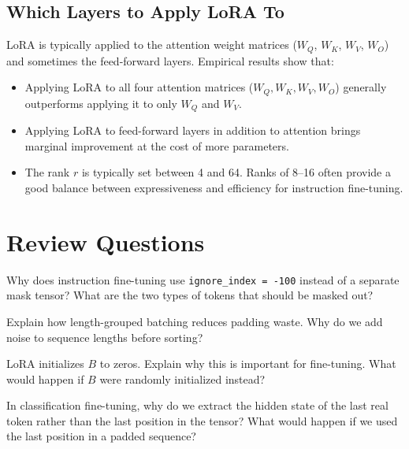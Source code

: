 \subsection{Which Layers to Apply LoRA To}

LoRA is typically applied to the attention weight matrices ($W_Q$,
$W_K$, $W_V$, $W_O$) and sometimes the feed-forward layers. Empirical
results show that:

\begin{itemize}
  \item Applying LoRA to all four attention matrices ($W_Q, W_K, W_V,
        W_O$) generally outperforms applying it to only $W_Q$ and
        $W_V$.
  \item Applying LoRA to feed-forward layers in addition to attention
        brings marginal improvement at the cost of more parameters.
  \item The rank $r$ is typically set between 4 and 64. Ranks of 8--16
        often provide a good balance between expressiveness and
        efficiency for instruction fine-tuning.
\end{itemize}

\section*{Review Questions}

\begin{reviewquestion}[1]
  Why does instruction fine-tuning use \texttt{ignore\_index = -100}
  instead of a separate mask tensor? What are the two types of tokens
  that should be masked out?
\end{reviewquestion}

\begin{reviewquestion}[2]
  Explain how length-grouped batching reduces padding waste. Why do
  we add noise to sequence lengths before sorting?
\end{reviewquestion}

\begin{reviewquestion}[3]
  LoRA initializes $B$ to zeros. Explain why this is important for
  fine-tuning. What would happen if $B$ were randomly initialized
  instead?
\end{reviewquestion}

\begin{reviewquestion}[4]
  In classification fine-tuning, why do we extract the hidden state of
  the last real token rather than the last position in the tensor? What
  would happen if we used the last position in a padded sequence?
\end{reviewquestion}

